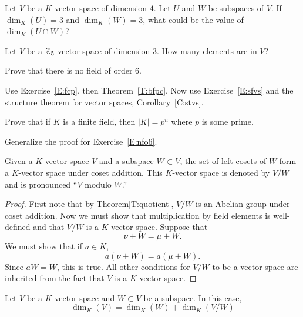 \documentclass{ximera}
\begin{document}
\begin{exercise}
  Let $V$ be a $K$-vector space of dimension $4$. Let $U$ and $W$ be
  subspaces of $V$. If $\dim_K(U) = 3$ and $\dim_K(W) =3$, what could
  be the value of $\dim_K(U\cap W)$?
\end{exercise}

\begin{exercise}
  Let $V$ be a $\mathbb Z_5$-vector space of dimension $3$. How many elements
  are in $V$?
\end{exercise}

\begin{exercise}\label{E:nfo6}
  Prove that there is no field of order $6$.
  \begin{hint}
    Use Exercise~\ref{E:fcp}, then Theorem~\ref{T:bfpc}. Now use
    Exercise~\ref{E:sfvs} and the structure theorem for vector spaces,
    Corollary~\ref{C:stvs}.
  \end{hint}
\end{exercise}

\begin{corollary}
  Prove that if $K$ is a finite field, then $|K|= p^n$ where $p$ is
  some prime.
  \begin{sketch}
    Generalize the proof for Exercise~\ref{E:nfo6}.
  \end{sketch}
\end{corollary}



\begin{theorem}
  Given a $K$-vector space $V$ and a subspace $W\subset V$, the set of
  left cosets of $W$ form a $K$-vector space under coset
  addition. This $K$-vector space is denoted by $V/W$ and is
  pronounced ``$V$ modulo $W$.''
  \begin{proof}
    First note that by Theorem\ref{T:quotient}, $V/W$ is an Abelian
    group under coset addition. Now we must show that multiplication
    by field elements is well-defined and that
    $V/W$ is a $K$-vector space. Suppose that
    \[
    \nu + W = \mu + W.
    \]
    We must show that if $a\in K$,
    \[
    a(\nu + W) = a(\mu + W).
    \]
    Since $aW = W$, this is true. All other conditions for $V/W$ to be
    a vector space are inherited from the fact that $V$ is a $K$-vector
    space.
  \end{proof}
\end{theorem}

\begin{corollary}
  Let $V$ be a $K$-vector space and $W\subset V$ be a subspace. In
  this case,
  \[
  \dim_K(V) = \dim_K(W) + \dim_K(V/W)
  \]
\end{corollary}
\end{document}
